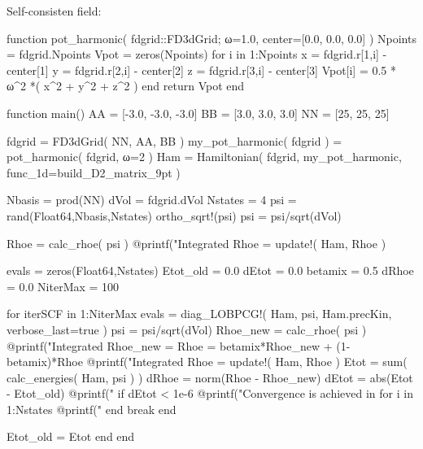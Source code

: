 Self-consisten field:
\begin{juliacode}
function pot_harmonic( fdgrid::FD3dGrid; ω=1.0, center=[0.0, 0.0, 0.0] )
    Npoints = fdgrid.Npoints
    Vpot = zeros(Npoints)
    for i in 1:Npoints
        x = fdgrid.r[1,i] - center[1]
        y = fdgrid.r[2,i] - center[2]
        z = fdgrid.r[3,i] - center[3]
        Vpot[i] = 0.5 * ω^2 *( x^2 + y^2 + z^2 )
    end
    return Vpot
end

function main()
    AA = [-3.0, -3.0, -3.0]
    BB = [3.0, 3.0, 3.0]
    NN = [25, 25, 25]

    fdgrid = FD3dGrid( NN, AA, BB )
    my_pot_harmonic( fdgrid ) = pot_harmonic( fdgrid, ω=2 )
    Ham = Hamiltonian( fdgrid, my_pot_harmonic, func_1d=build_D2_matrix_9pt )

    Nbasis = prod(NN)
    dVol = fdgrid.dVol
    Nstates = 4
    psi = rand(Float64,Nbasis,Nstates)
    ortho_sqrt!(psi)
    psi = psi/sqrt(dVol)

    Rhoe = calc_rhoe( psi )
    @printf("Integrated Rhoe = %
    update!( Ham, Rhoe )

    evals = zeros(Float64,Nstates)
    Etot_old = 0.0
    dEtot = 0.0
    betamix = 0.5
    dRhoe = 0.0
    NiterMax = 100

    for iterSCF in 1:NiterMax
        evals = diag_LOBPCG!( Ham, psi, Ham.precKin, verbose_last=true )
        psi = psi/sqrt(dVol)
        Rhoe_new = calc_rhoe( psi )
        @printf("Integrated Rhoe_new = %
        Rhoe = betamix*Rhoe_new + (1-betamix)*Rhoe
        @printf("Integrated Rhoe     = %
        update!( Ham, Rhoe )
        Etot = sum( calc_energies( Ham, psi ) )
        dRhoe = norm(Rhoe - Rhoe_new)
        dEtot = abs(Etot - Etot_old)
        @printf("%
        if dEtot < 1e-6
            @printf("Convergence is achieved in %
            for i in 1:Nstates
                @printf("%
            end
            break
        end

        Etot_old = Etot
    end
end
\end{juliacode}

